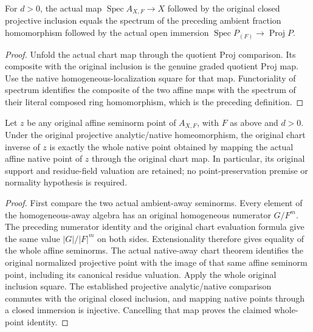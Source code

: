 \begin{lemma}
\label{projective:actual-admissible-ambient-native-square}
\leanok
{}
For $d>0$, the actual map $\operatorname{Spec} A_{X,F}\to X$ followed by the
original closed projective inclusion equals the spectrum of the preceding
ambient fraction homomorphism followed by the actual open immersion
$\operatorname{Spec} P_{(F)}\to\operatorname{Proj} P$.
\end{lemma}
\begin{proof}
Unfold the actual chart map through the quotient Proj comparison. Its composite
with the original inclusion is the genuine graded quotient Proj map. Use the
native homogeneous-localization square for that map. Functoriality of spectrum
identifies the composite of the two affine maps with the spectrum of their
literal composed ring homomorphism, which is the preceding definition.
\end{proof}

\begin{theorem}
\label{projective:actual-admissible-analytic-native-chart}
\leanok
{}
Let $z$ be any original affine seminorm point of $A_{X,F}$, with $F$ as above
and $d>0$. Under the original projective analytic/native homeomorphism, the
original chart inverse of $z$ is exactly the whole native point obtained by
mapping the actual affine native point of $z$ through the original chart map.
In particular, its original support and residue-field valuation are retained;
no point-preservation premise or normality hypothesis is required.
\end{theorem}
\begin{proof}
First compare the two actual ambient-away seminorms. Every element of the
homogeneous-away algebra has an original homogeneous numerator $G/F^m$.
The preceding numerator identity and the original chart evaluation formula
give the same value $|G|/|F|^m$ on both sides. Extensionality therefore gives
equality of the whole affine seminorms. The actual native-away chart theorem
identifies the original normalized projective point with the image of that
same affine seminorm point, including its canonical residue valuation.
Apply the whole original inclusion square. The established projective
analytic/native comparison commutes with the original closed inclusion, and
mapping native points through a closed immersion is injective. Cancelling
that map proves the claimed whole-point identity.
\end{proof}
